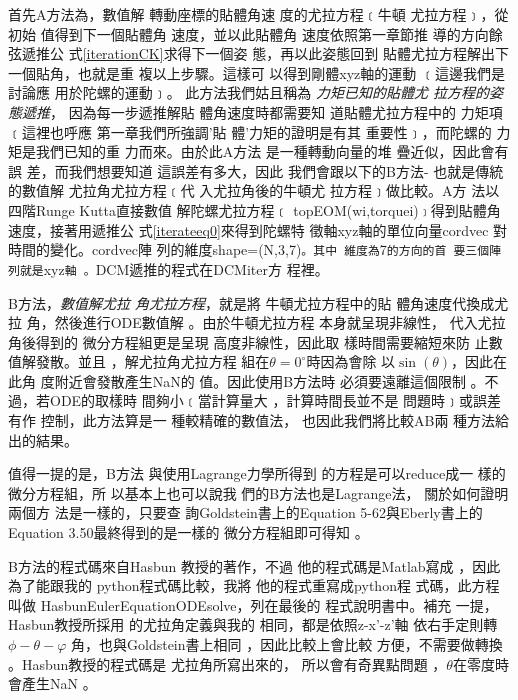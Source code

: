 \documentclass[12pt,twoside]{article}
\begin{document}
首先A方法為，數值解%
轉動座標的貼體角速%
度的尤拉方程﹝牛頓%
尤拉方程﹞，從初始%
值得到下一個貼體角%
速度，並以此貼體角%
速度依照第一章節推%
導的方向餘弦遞推公%
式\ref{iterationCK}求得下一個姿%
態，再以此姿態回到%
貼體尤拉方程解出下%
一個貼角，也就是重%
複以上步驟。這樣可%
以得到剛體xyz軸的運動%
﹝這邊我們是討論應%
用於陀螺的運動﹞。%
此方法我們姑且稱為%
\emph{力矩已知的貼體尤%
拉方程的姿態遞推}，%
因為每一步遞推解貼%
體角速度時都需要知%
道貼體尤拉方程中的%
力矩項﹝這裡也呼應%
第一章我們所強調'貼%
體'力矩的證明是有其%
重要性﹞，而陀螺的%
力矩是我們已知的重%
力而來。由於此A方法%
是一種轉動向量的堆%
疊近似，因此會有誤%
差，而我們想要知道%
這誤差有多大，因此%
我們會跟以下的B方法-%
也就是傳統的數值解%
尤拉角尤拉方程﹝代%
入尤拉角後的牛頓尤%
拉方程﹞做比較。A方%
法以四階Runge Kutta直接數值%
解陀螺尤拉方程﹝%
topEOM(wi,torquei)\texttt{﹞}得到貼體角%
速度，接著用遞推公%
式\ref{iterateeq0}來得到陀螺特%
徵軸xyz軸的單位向量cordvec%
對時間的變化。cordvec陣%
列的維度shape=(N,3,7)\texttt{。其中%
維度為}7\texttt{的方向的首%
要三個陣列就是}xyz\texttt{軸%
。}DCM遞推的程式在DCMiter方%
程裡。

\bigskip

B方法，\emph{數值解尤拉%
角尤拉方程}，就是將%
牛頓尤拉方程中的貼%
體角速度代換成尤拉%
角，然後進行ODE數值解%
。由於牛頓尤拉方程%
本身就呈現非線性，%
代入尤拉角後得到的%
微分方程組更是呈現%
高度非線性，因此取%
樣時間需要縮短來防%
止數值解發散。並且%
，解尤拉角尤拉方程%
組在$\theta =0^{\circ }$時因為會除%
以$\sin (\theta )$，因此在此角%
度附近會發散產生NaN的%
值。因此使用B方法時%
必須要遠離這個限制%
。不過，若ODE的取樣時%
間夠小﹝當計算量大%
，計算時間長並不是%
問題時﹞或誤差有作%
控制，此方法算是一%
種較精確的數值法，%
也因此我們將比較AB兩%
種方法給出的結果。

\bigskip

值得一提的是，B方法%
與使用Lagrange力學所得到%
的方程是可以reduce成一%
樣的微分方程組，所%
以基本上也可以說我%
們的B方法也是Lagrange法，%
關於如何證明兩個方%
法是一樣的，只要查%
詢Goldstein書上\cite[Page 216]{goldstein}的Equation
5-62與Eberly書上\cite[Page 158]{eberly}的Equation
3.50最終得到的是一樣的%
微分方程組即可得知%
。

\bigskip

B方法的程式碼來自Hasbun%
教授的著作\cite{hasbun}，不過%
他的程式碼是Matlab寫成%
，因此為了能跟我的%
python程式碼比較，我將%
他的程式重寫成python程%
式碼，此方程叫做%
HasbunEulerEquationODEsolve，列在最後的%
程式說明書中。補充%
一提，Hasbun教授所採用%
的尤拉角定義與我的%
相同，都是依照z-x'-z'軸%
依右手定則轉$\phi -\theta -\varphi $%
角，也與Goldstein書上相同%
，因此比較上會比較%
方便，不需要做轉換%
。Hasbun教授的程式碼是%
尤拉角所寫出來的，%
所以會有奇異點問題%
，$\theta $在零度時會產生NaN%
。
\end{document}
